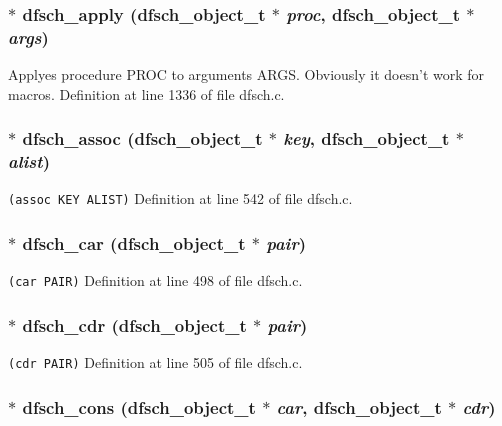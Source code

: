 \subsubsection{$\ast$ dfsch\_\-apply ({\bf dfsch\_\-object\_\-t} $\ast$ {\em proc}, {\bf dfsch\_\-object\_\-t} $\ast$ {\em args})}\label{dfsch_8h_a45}


Applyes procedure PROC to arguments ARGS. Obviously it doesn't work for macros. Definition at line 1336 of file dfsch.c.
\subsubsection{$\ast$ dfsch\_\-assoc ({\bf dfsch\_\-object\_\-t} $\ast$ {\em key}, {\bf dfsch\_\-object\_\-t} $\ast$ {\em alist})}\label{dfsch_8h_a30}


{\tt (assoc KEY ALIST)} Definition at line 542 of file dfsch.c.
\subsubsection{$\ast$ dfsch\_\-car ({\bf dfsch\_\-object\_\-t} $\ast$ {\em pair})}\label{dfsch_8h_a25}


{\tt (car PAIR)} Definition at line 498 of file dfsch.c.
\subsubsection{$\ast$ dfsch\_\-cdr ({\bf dfsch\_\-object\_\-t} $\ast$ {\em pair})}\label{dfsch_8h_a26}


{\tt (cdr PAIR)} Definition at line 505 of file dfsch.c.
\subsubsection{$\ast$ dfsch\_\-cons ({\bf dfsch\_\-object\_\-t} $\ast$ {\em car}, {\bf dfsch\_\-object\_\-t} $\ast$ {\em cdr})}\label{dfsch_8h_a24}


